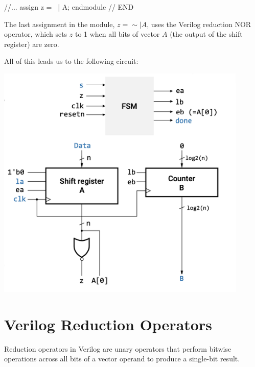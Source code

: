 \documentclass[12pt,openany]{book}
\begin{document}
\begin{minipage}[htp]{0.45\textwidth}
\begin{vhdl}
//...
assign z = ~| A;
endmodule
// END
\end{vhdl}
\end{minipage}
\hfill
\vline
\hfill
\begin{minipage}[htp]{0.45\textwidth}
	The last assignment in the module, \( z = \sim| A \), uses the Verilog reduction NOR operator, which sets \( z \) to 1 when all bits of vector \( A \) (the output of the shift register) are zero.
\end{minipage}
\newline
All of this leads us to the following circuit:
\begin{center}
	\includegraphics[width=0.9\textwidth]{circuits/18.4.1.png}
\end{center}

\section{Verilog Reduction Operators}

Reduction operators in Verilog are unary operators that perform bitwise operations across all bits of a vector operand to produce a single-bit result.
\end{document}
